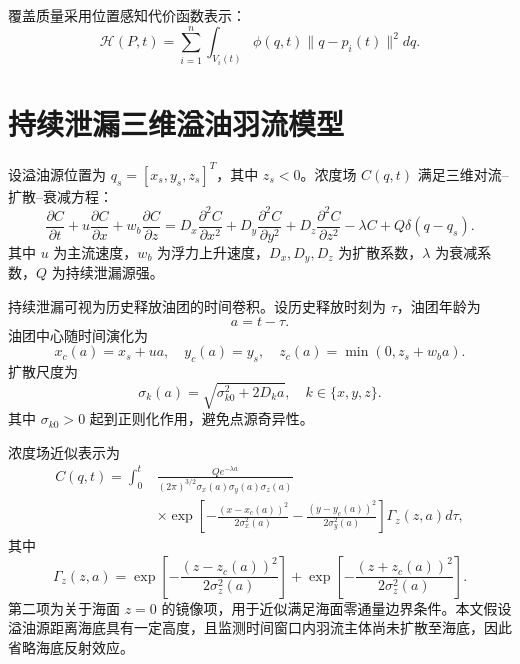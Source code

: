 \documentclass[conference]{IEEEtran}
\begin{document}
覆盖质量采用位置感知代价函数表示：
\begin{equation}
\mathcal{H}(P,t)=
\sum_{i=1}^{n}
\int_{V_i(t)}
\phi(q,t)\|q-p_i(t)\|^2dq.
\end{equation}

\section{持续泄漏三维溢油羽流模型}
设溢油源位置为 $q_s=[x_s,y_s,z_s]^T$，其中 $z_s<0$。浓度场 $C(q,t)$ 满足三维对流--扩散--衰减方程：
\begin{equation}
\frac{\partial C}{\partial t}
+u\frac{\partial C}{\partial x}
+w_b\frac{\partial C}{\partial z}
=
D_x\frac{\partial^2 C}{\partial x^2}
+D_y\frac{\partial^2 C}{\partial y^2}
+D_z\frac{\partial^2 C}{\partial z^2}
-\lambda C
+Q\delta(q-q_s).
\end{equation}
其中 $u$ 为主流速度，$w_b$ 为浮力上升速度，$D_x,D_y,D_z$ 为扩散系数，$\lambda$ 为衰减系数，$Q$ 为持续泄漏源强。

持续泄漏可视为历史释放油团的时间卷积。设历史释放时刻为 $\tau$，油团年龄为
\begin{equation}
a=t-\tau.
\end{equation}
油团中心随时间演化为
\begin{equation}
x_c(a)=x_s+ua,\quad y_c(a)=y_s,\quad z_c(a)=\min(0,z_s+w_ba).
\end{equation}
扩散尺度为
\begin{equation}
\sigma_k(a)=\sqrt{\sigma_{k0}^2+2D_ka},\quad k\in\{x,y,z\}.
\end{equation}
其中 $\sigma_{k0}>0$ 起到正则化作用，避免点源奇异性。

浓度场近似表示为
\begin{equation}
\begin{aligned}
C(q,t)=
\int_0^t
&\frac{Qe^{-\lambda a}}
{(2\pi)^{3/2}\sigma_x(a)\sigma_y(a)\sigma_z(a)}
\\
&\times
\exp\left[
-\frac{(x-x_c(a))^2}{2\sigma_x^2(a)}
-\frac{(y-y_c(a))^2}{2\sigma_y^2(a)}
\right]\Gamma_z(z,a)d\tau,
\end{aligned}
\end{equation}
其中
\begin{equation}
\Gamma_z(z,a)=
\exp\left[-\frac{(z-z_c(a))^2}{2\sigma_z^2(a)}\right]
+
\exp\left[-\frac{(z+z_c(a))^2}{2\sigma_z^2(a)}\right].
\end{equation}
第二项为关于海面 $z=0$ 的镜像项，用于近似满足海面零通量边界条件。本文假设溢油源距离海底具有一定高度，且监测时间窗口内羽流主体尚未扩散至海底，因此省略海底反射效应。
\end{document}
